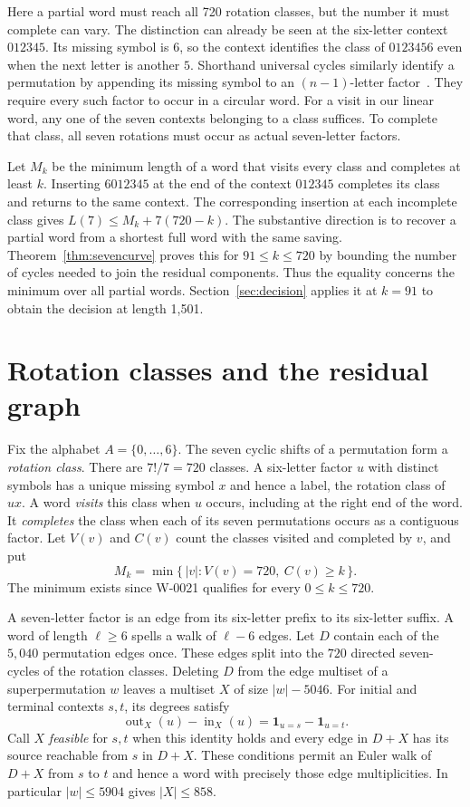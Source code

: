 \documentclass[11pt]{article}
\begin{document}
Here a partial word must reach all 720 rotation classes, but the number it must complete can vary. The distinction can already be seen at the six-letter context $012345$. Its missing symbol is $6$, so the context identifies the class of $0123456$ even when the next letter is another $5$. Shorthand universal cycles similarly identify a permutation by appending its missing symbol to an $(n-1)$-letter factor~\cite{shorthand}. They require every such factor to occur in a circular word. For a visit in our linear word, any one of the seven contexts belonging to a class suffices. To complete that class, all seven rotations must occur as actual seven-letter factors.

Let $M_k$ be the minimum length of a word that visits every class and completes at least $k$. Inserting $6012345$ at the end of the context $012345$ completes its class and returns to the same context. The corresponding insertion at each incomplete class gives $L(7)\le M_k+7(720-k)$. The substantive direction is to recover a partial word from a shortest full word with the same saving. Theorem~\ref{thm:sevencurve} proves this for $91\le k\le720$ by bounding the number of cycles needed to join the residual components. Thus the equality concerns the minimum over all partial words. Section~\ref{sec:decision} applies it at $k=91$ to obtain the decision at length 1,501.

\section{Rotation classes and the residual graph}
\label{sec:graph}


Fix the alphabet $A=\{0,\ldots,6\}$. The seven cyclic shifts of a
permutation form a \emph{rotation class}. There are $7!/7=720$ classes.
A six-letter factor $u$ with distinct symbols has a unique missing symbol
$x$ and hence a label, the rotation class of $ux$. A word \emph{visits}
this class when $u$ occurs, including at the right end of the word.
It \emph{completes} the class when each of its seven permutations occurs
as a contiguous factor. Let $V(v)$ and $C(v)$ count the classes visited
and completed by $v$, and put
\[
 M_k=\min\{\,|v|: V(v)=720,\ C(v)\ge k\,\}.
\]
The minimum exists since W-0021 qualifies for every $0\le k\le720$.

A seven-letter factor is an edge from its six-letter prefix to its
six-letter suffix. A word of length $\ell\ge6$ spells a walk of
$\ell-6$ edges. Let $D$ contain each of the $5{,}040$ permutation edges
once. These edges split into the $720$ directed seven-cycles of the
rotation classes. Deleting $D$ from the edge multiset of a superpermutation
$w$ leaves a multiset $X$ of size $|w|-5046$. For initial and terminal
contexts $s,t$, its degrees satisfy
\[
  \operatorname{out}_X(u)-\operatorname{in}_X(u)
  =\mathbf1_{u=s}-\mathbf1_{u=t}.
\]
Call $X$ \emph{feasible} for $s,t$ when this identity holds and every
edge in $D+X$ has its source reachable from $s$ in $D+X$. These conditions
permit an Euler walk of $D+X$ from $s$ to $t$ and hence a word with precisely
those edge multiplicities. In particular $|w|\le5904$ gives $|X|\le858$.
\end{document}
